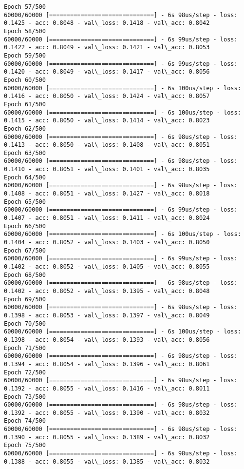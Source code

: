 \documentclass[11pt]{article}
\begin{document}
\begin{Verbatim}[commandchars=\\\{\}]
Epoch 57/500
60000/60000 [==============================] - 6s 98us/step - loss: 0.1425 - acc: 0.8048 - val\_loss: 0.1418 - val\_acc: 0.8042
Epoch 58/500
60000/60000 [==============================] - 6s 99us/step - loss: 0.1422 - acc: 0.8049 - val\_loss: 0.1421 - val\_acc: 0.8053
Epoch 59/500
60000/60000 [==============================] - 6s 99us/step - loss: 0.1420 - acc: 0.8049 - val\_loss: 0.1417 - val\_acc: 0.8056
Epoch 60/500
60000/60000 [==============================] - 6s 100us/step - loss: 0.1416 - acc: 0.8050 - val\_loss: 0.1424 - val\_acc: 0.8057
Epoch 61/500
60000/60000 [==============================] - 6s 100us/step - loss: 0.1415 - acc: 0.8050 - val\_loss: 0.1414 - val\_acc: 0.8023
Epoch 62/500
60000/60000 [==============================] - 6s 98us/step - loss: 0.1413 - acc: 0.8050 - val\_loss: 0.1408 - val\_acc: 0.8051
Epoch 63/500
60000/60000 [==============================] - 6s 98us/step - loss: 0.1410 - acc: 0.8051 - val\_loss: 0.1401 - val\_acc: 0.8035
Epoch 64/500
60000/60000 [==============================] - 6s 98us/step - loss: 0.1408 - acc: 0.8051 - val\_loss: 0.1427 - val\_acc: 0.8018
Epoch 65/500
60000/60000 [==============================] - 6s 99us/step - loss: 0.1407 - acc: 0.8051 - val\_loss: 0.1411 - val\_acc: 0.8024
Epoch 66/500
60000/60000 [==============================] - 6s 100us/step - loss: 0.1404 - acc: 0.8052 - val\_loss: 0.1403 - val\_acc: 0.8050
Epoch 67/500
60000/60000 [==============================] - 6s 99us/step - loss: 0.1402 - acc: 0.8052 - val\_loss: 0.1405 - val\_acc: 0.8055
Epoch 68/500
60000/60000 [==============================] - 6s 98us/step - loss: 0.1402 - acc: 0.8052 - val\_loss: 0.1395 - val\_acc: 0.8048
Epoch 69/500
60000/60000 [==============================] - 6s 98us/step - loss: 0.1398 - acc: 0.8053 - val\_loss: 0.1397 - val\_acc: 0.8049
Epoch 70/500
60000/60000 [==============================] - 6s 100us/step - loss: 0.1398 - acc: 0.8054 - val\_loss: 0.1393 - val\_acc: 0.8056
Epoch 71/500
60000/60000 [==============================] - 6s 98us/step - loss: 0.1394 - acc: 0.8054 - val\_loss: 0.1396 - val\_acc: 0.8061
Epoch 72/500
60000/60000 [==============================] - 6s 98us/step - loss: 0.1392 - acc: 0.8055 - val\_loss: 0.1416 - val\_acc: 0.8011
Epoch 73/500
60000/60000 [==============================] - 6s 98us/step - loss: 0.1392 - acc: 0.8055 - val\_loss: 0.1390 - val\_acc: 0.8032
Epoch 74/500
60000/60000 [==============================] - 6s 98us/step - loss: 0.1390 - acc: 0.8055 - val\_loss: 0.1389 - val\_acc: 0.8032
Epoch 75/500
60000/60000 [==============================] - 6s 98us/step - loss: 0.1388 - acc: 0.8055 - val\_loss: 0.1385 - val\_acc: 0.8032

\end{Verbatim}
\end{document}
